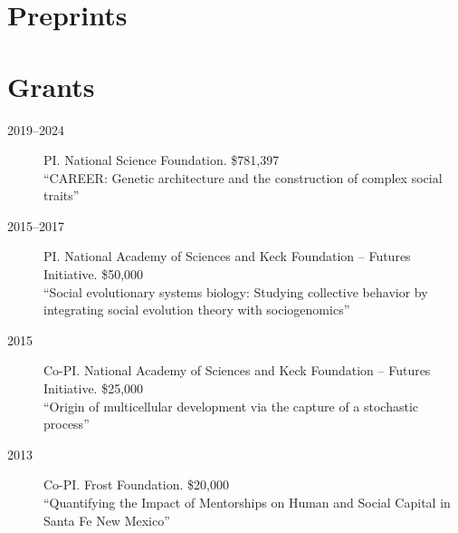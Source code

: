 \documentclass[11pt]{article}
\begin{document}
  \begin{publist}
    
    
    
  \end{publist}
  
  \section{Preprints}
  
  \begin{publist}

  \item {}
    
  \item {}

  \item {}
    
  \item {}
    
  \item {}
    
  \end{publist}
  


%     
    


  \section{Grants}
  \begin{description}
  \item[2019--2024] PI. National Science Foundation. \$781,397\\
    ``CAREER: Genetic architecture and the construction of complex social traits''
  \item[2015--2017] PI. National Academy of Sciences and Keck Foundation -- Futures Initiative. \$50,000\\
    ``Social evolutionary systems biology: Studying collective behavior by integrating social evolution theory with sociogenomics''
  \item[2015] Co-PI. National Academy of Sciences and Keck Foundation -- Futures Initiative. \$25,000\\
    ``Origin of multicellular development via the capture of a stochastic process''
  \item[2013] Co-PI. Frost Foundation. \$20,000 \\
    ``Quantifying the Impact of Mentorships on Human and Social Capital in Santa Fe New Mexico''
  \end{description}
  
\end{document}
